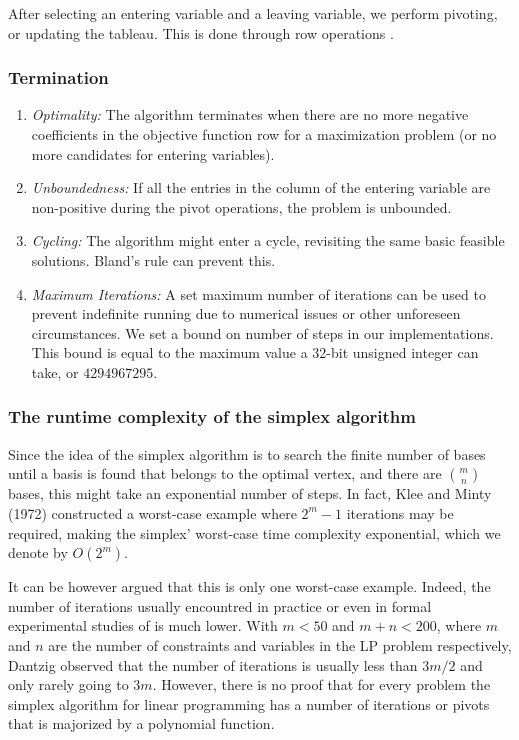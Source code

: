 After selecting an entering variable and a leaving variable, we perform pivoting, or
updating the tableau. This is done through row operations \parencite{chvatal1983linear}.

\subsubsection{Termination}
\begin{enumerate}
    \item \textit{Optimality:}
          The algorithm terminates when there are no more negative coefficients in the objective function
          row for a maximization problem (or no more candidates for entering variables).

    \item \textit{Unboundedness:}
          If all the entries in the column of the entering variable are non-positive during the pivot
          operations, the problem is unbounded.

    \item \textit{Cycling:}
          The algorithm might enter a cycle, revisiting the same basic feasible solutions. Bland's rule
          can prevent this.

    \item \textit{Maximum Iterations:}
          A set maximum number of iterations can be used to prevent indefinite running due to
          numerical issues or other unforeseen circumstances. We set a bound on number of steps in our
          implementations. This bound is equal to the maximum value a 32-bit unsigned integer can take, or
          $4294967295$.
\end{enumerate}

\subsubsection{The runtime complexity of the simplex algorithm}
Since the idea of the simplex algorithm is to search the finite number of bases until a basis is
found that belongs to the optimal vertex, and there are $\binom{m}{n}$ bases, this might take an exponential number of steps. In fact, Klee and Minty (1972) \parencite{klee1972good} constructed a worst-case example where $2^m -1$ iterations may be required, making the simplex' worst-case time complexity exponential, which we denote by \( O(2^m) \).

It can be however argued that this is only one worst-case example. Indeed, the number
of iterations usually encountred in practice or even in formal experimental studies of is much lower.
With $m<50$ and $m+n<200$, where $m$ and $n$ are the number of constraints and variables in the LP problem respectively, Dantzig \parencite{dantzig1990origins} observed that the number of iterations is usually less than $3m/2$
and only rarely going to $3m$. However, there is no proof that for every problem the simplex algorithm for linear programming has a number of iterations or pivots that is majorized by a polynomial function.

